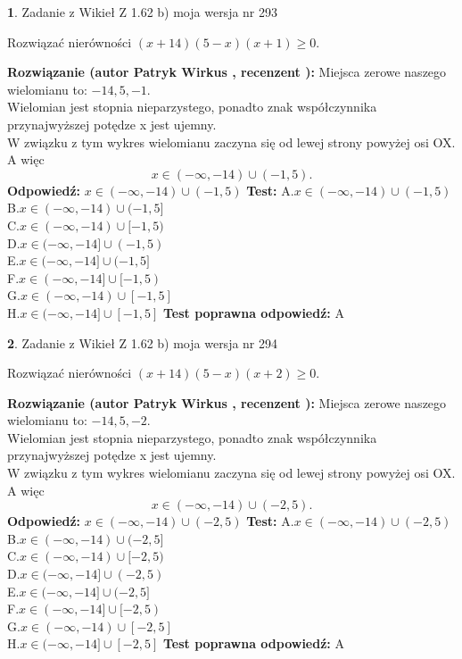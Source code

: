 \documentclass[12pt, a4paper]{article}
\theoremstyle{definition} %
\newtheorem{zad}{}
\newcommand{\zadStart}[1]{\begin{zad}#1\newline}
\newcommand{\zadStop}{\end{zad}}
\newcommand{\rozwStart}[2]{\noindent \textbf{Rozwiązanie (autor #1 , recenzent #2): }\newline}
\newcommand{\rozwStop}{\newline}
\newcommand{\odpStart}{\noindent \textbf{Odpowiedź:}\newline}
\newcommand{\odpStop}{\newline}
\newcommand{\testStart}{\noindent \textbf{Test:}\newline}
\newcommand{\testStop}{\newline}
\newcommand{\kluczStart}{\noindent \textbf{Test poprawna odpowiedź:}\newline}
\newcommand{\kluczStop}{\newline}
\begin{document}
\zadStart{Zadanie z Wikieł Z 1.62 b) moja wersja nr 293}

Rozwiązać nierówności $(x+14)(5-x)(x+1)\ge0$.
\zadStop
\rozwStart{Patryk Wirkus}{}
Miejsca zerowe naszego wielomianu to: $-14, 5, -1$.\\
Wielomian jest stopnia nieparzystego, ponadto znak współczynnika przy\linebreak najwyższej potędze x jest ujemny.\\ W związku z tym wykres wielomianu zaczyna się od lewej strony powyżej osi OX. A więc $$x \in (-\infty,-14) \cup (-1,5).$$
\rozwStop
\odpStart
$x \in (-\infty,-14) \cup (-1,5)$
\odpStop
\testStart
A.$x \in (-\infty,-14) \cup (-1,5)$\\
B.$x \in (-\infty,-14) \cup (-1,5]$\\
C.$x \in (-\infty,-14) \cup [-1,5)$\\
D.$x \in (-\infty,-14] \cup (-1,5)$\\
E.$x \in (-\infty,-14] \cup (-1,5]$\\
F.$x \in (-\infty,-14] \cup [-1,5)$\\
G.$x \in (-\infty,-14) \cup [-1,5]$\\
H.$x \in (-\infty,-14] \cup [-1,5]$
\testStop
\kluczStart
A
\kluczStop



\zadStart{Zadanie z Wikieł Z 1.62 b) moja wersja nr 294}

Rozwiązać nierówności $(x+14)(5-x)(x+2)\ge0$.
\zadStop
\rozwStart{Patryk Wirkus}{}
Miejsca zerowe naszego wielomianu to: $-14, 5, -2$.\\
Wielomian jest stopnia nieparzystego, ponadto znak współczynnika przy\linebreak najwyższej potędze x jest ujemny.\\ W związku z tym wykres wielomianu zaczyna się od lewej strony powyżej osi OX. A więc $$x \in (-\infty,-14) \cup (-2,5).$$
\rozwStop
\odpStart
$x \in (-\infty,-14) \cup (-2,5)$
\odpStop
\testStart
A.$x \in (-\infty,-14) \cup (-2,5)$\\
B.$x \in (-\infty,-14) \cup (-2,5]$\\
C.$x \in (-\infty,-14) \cup [-2,5)$\\
D.$x \in (-\infty,-14] \cup (-2,5)$\\
E.$x \in (-\infty,-14] \cup (-2,5]$\\
F.$x \in (-\infty,-14] \cup [-2,5)$\\
G.$x \in (-\infty,-14) \cup [-2,5]$\\
H.$x \in (-\infty,-14] \cup [-2,5]$
\testStop
\kluczStart
A
\kluczStop
\end{document}
